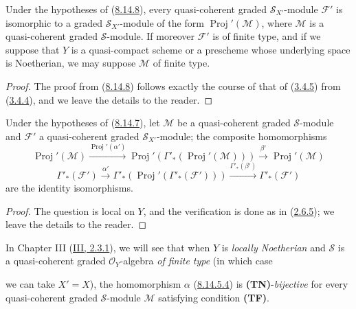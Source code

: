 \begin{corollary}[8.14.9]
\label{II.8.14.9}
Under the hypotheses of (\hyperref[II.8.14.8]{8.14.8}), every
quasi-coherent graded $\mathcal{S}_{X'}$-module $\mathcal{F}'$ is isomorphic
to a graded $\mathcal{S}_{X'}$-module of the form
$\operatorname{Proj}'(\mathcal{M})$, where $\mathcal{M}$ is a
quasi-coherent graded $\mathcal{S}$-module. If moreover $\mathcal{F}'$ is of
finite type, and if we suppose that $Y$ is a quasi-compact scheme or a
prescheme whose underlying space is Noetherian, we may suppose
$\mathcal{M}$ of finite type.
\end{corollary}

\begin{proof}
The proof from (\hyperref[II.8.14.8]{8.14.8}) follows
exactly the course of that of (\hyperref[II.3.4.5]{3.4.5}) from
(\hyperref[II.3.4.4]{3.4.4}), and we leave the details to the reader.
\end{proof}

\begin{proposition}[8.14.10]
\label{II.8.14.10}
Under the hypotheses of (\hyperref[II.8.14.7]{8.14.7}), let
$\mathcal{M}$ be a quasi-coherent graded $\mathcal{S}$-module and
$\mathcal{F}'$ a quasi-coherent graded $\mathcal{S}_{X'}$-module; the
composite homomorphisms
\begin{equation}
\label{II.8.14.10.1}
  \operatorname{Proj}'(\mathcal{M})
  \xrightarrow{\operatorname{Proj}'(\alpha')}
  \operatorname{Proj}'(\Gamma'_*(\operatorname{Proj}'(\mathcal{M})))
  \xrightarrow{\beta'}\operatorname{Proj}'(\mathcal{M})
\tag{8.14.10.1}
\end{equation}
\begin{equation}
\label{II.8.14.10.2}
  \Gamma'_*(\mathcal{F}')
  \xrightarrow{\alpha'}
  \Gamma'_*(\operatorname{Proj}'(\Gamma'_*(\mathcal{F}')))
  \xrightarrow{\Gamma'_*(\beta')}\Gamma'_*(\mathcal{F}')
\tag{8.14.10.2}
\end{equation}
are the identity isomorphisms.
\end{proposition}

\begin{proof}
The question is local on $Y$, and the verification is done as in
(\hyperref[II.2.6.5]{2.6.5}); we leave the details to the reader.
\end{proof}

\begin{remark}[8.14.11]
\label{II.8.14.11}
In Chapter III (\hyperref[III.2.3.1]{III, 2.3.1}), we will see that
when $Y$ is \emph{locally Noetherian} and $\mathcal{S}$ is a
quasi-coherent graded $\mathcal{O}_Y$-algebra \emph{of finite type} (in which
case

we can take $X'=X$), the homomorphism $\alpha$
(\hyperref[II.8.14.5.4]{8.14.5.4}) is \textbf{(TN)}-\emph{bijective} for
every quasi-coherent graded $\mathcal{S}$-module $\mathcal{M}$ satisfying
condition \textbf{(TF)}.
\end{remark}

